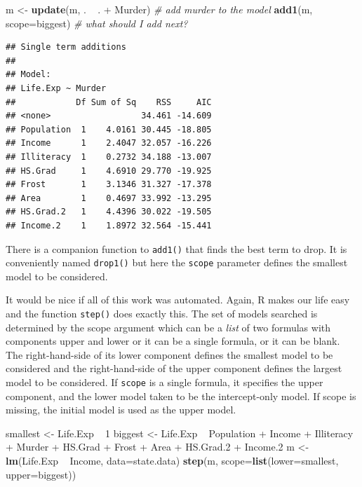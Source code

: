 \documentclass[]{book}
\newenvironment{Shaded}{\begin{snugshade}}{\end{snugshade}}
\newcommand{\KeywordTok}[1]{\textcolor[rgb]{0.13,0.29,0.53}{\textbf{{#1}}}}
\newcommand{\DataTypeTok}[1]{\textcolor[rgb]{0.13,0.29,0.53}{{#1}}}
\newcommand{\DecValTok}[1]{\textcolor[rgb]{0.00,0.00,0.81}{{#1}}}
\newcommand{\FloatTok}[1]{\textcolor[rgb]{0.00,0.00,0.81}{{#1}}}
\newcommand{\StringTok}[1]{\textcolor[rgb]{0.31,0.60,0.02}{{#1}}}
\newcommand{\CommentTok}[1]{\textcolor[rgb]{0.56,0.35,0.01}{\textit{{#1}}}}
\newcommand{\NormalTok}[1]{{#1}}
\theoremstyle{definition}
\theoremstyle{definition}
\theoremstyle{remark}
\begin{document}
\begin{Shaded}
\begin{Highlighting}[]
\NormalTok{m <-}\StringTok{ }\KeywordTok{update}\NormalTok{(m, . ~}\StringTok{ }\NormalTok{. +}\StringTok{ }\NormalTok{Murder)  }\CommentTok{# add murder to the model}
\KeywordTok{add1}\NormalTok{(m, }\DataTypeTok{scope=}\NormalTok{biggest)          }\CommentTok{# what should I add next?}
\end{Highlighting}
\end{Shaded}

\begin{verbatim}
## Single term additions
## 
## Model:
## Life.Exp ~ Murder
##            Df Sum of Sq    RSS     AIC
## <none>                  34.461 -14.609
## Population  1    4.0161 30.445 -18.805
## Income      1    2.4047 32.057 -16.226
## Illiteracy  1    0.2732 34.188 -13.007
## HS.Grad     1    4.6910 29.770 -19.925
## Frost       1    3.1346 31.327 -17.378
## Area        1    0.4697 33.992 -13.295
## HS.Grad.2   1    4.4396 30.022 -19.505
## Income.2    1    1.8972 32.564 -15.441
\end{verbatim}

There is a companion function to \texttt{add1()} that finds the best
term to drop. It is conveniently named \texttt{drop1()} but here the
\texttt{scope} parameter defines the smallest model to be considered.

It would be nice if all of this work was automated. Again, R makes our
life easy and the function \texttt{step()} does exactly this. The set of
models searched is determined by the scope argument which can be a
\emph{list} of two formulas with components upper and lower or it can be
a single formula, or it can be blank. The right-hand-side of its lower
component defines the smallest model to be considered and the
right-hand-side of the upper component defines the largest model to be
considered. If \texttt{scope} is a single formula, it specifies the
upper component, and the lower model taken to be the intercept-only
model. If scope is missing, the initial model is used as the upper
model.

\begin{Shaded}
\begin{Highlighting}[]
\NormalTok{smallest <-}\StringTok{ }\NormalTok{Life.Exp ~}\StringTok{ }\DecValTok{1}
\NormalTok{biggest <-}\StringTok{ }\NormalTok{Life.Exp ~}\StringTok{ }\NormalTok{Population +}\StringTok{ }\NormalTok{Income +}\StringTok{ }\NormalTok{Illiteracy +}\StringTok{ }
\StringTok{                      }\NormalTok{Murder +}\StringTok{ }\NormalTok{HS.Grad +}\StringTok{ }\NormalTok{Frost +}\StringTok{ }\NormalTok{Area +}\StringTok{ }\NormalTok{HS.Grad}\FloatTok{.2} \NormalTok{+}\StringTok{ }\NormalTok{Income}\FloatTok{.2}
\NormalTok{m <-}\StringTok{ }\KeywordTok{lm}\NormalTok{(Life.Exp ~}\StringTok{ }\NormalTok{Income, }\DataTypeTok{data=}\NormalTok{state.data)}
\KeywordTok{step}\NormalTok{(m, }\DataTypeTok{scope=}\KeywordTok{list}\NormalTok{(}\DataTypeTok{lower=}\NormalTok{smallest, }\DataTypeTok{upper=}\NormalTok{biggest))}
\end{Highlighting}
\end{Shaded}
\end{document}
